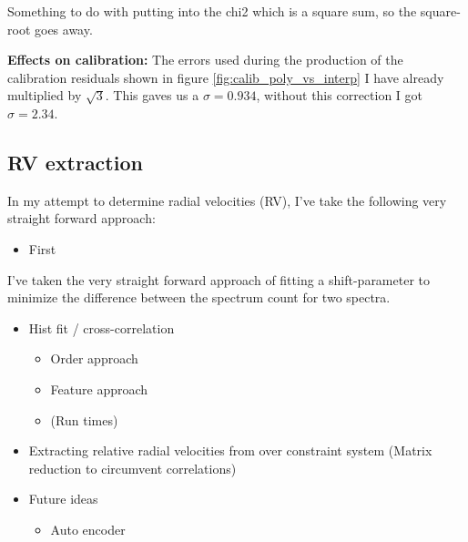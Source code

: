      Something to do with putting into the chi2 which is a square sum, so the square-root goes away. 

    \bigbreak

    \noindent \textbf{Effects on calibration:} \newline
    The errors used during the production of the calibration residuals shown in figure \ref{fig:calib_poly_vs_interp} I have already multiplied by $\sqrt{3}$. This gaves us a $\sigma = 0.934$, without this correction I got $\sigma = 2.34$. 


\subsection{RV extraction}
    In my attempt to determine radial velocities (RV), I've take the following very straight forward approach: 
    \begin{itemize}
        \item First 
    \end{itemize}
    
    I've taken the very straight forward approach of fitting a shift-parameter to minimize the difference between the spectrum count for two spectra. 


    \begin{itemize}
        \item Hist fit / cross-correlation
        \begin{itemize}
            \item Order approach
            \item Feature approach
            \item (Run times)
        \end{itemize}
        \item Extracting relative radial velocities from over constraint system (Matrix reduction to circumvent correlations)
        \item Future ideas
        \begin{itemize}
            \item Auto encoder
        \end{itemize}
    \end{itemize}

